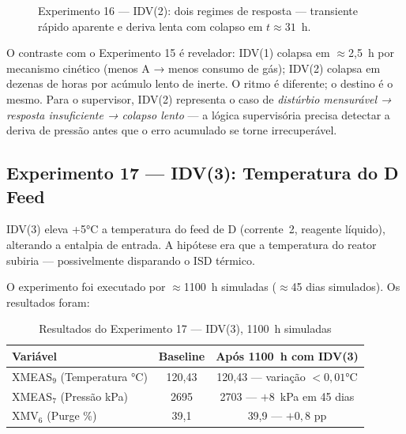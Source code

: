 \begin{figure}[htbp]
\centering
{}
\caption{Experimento 16 --- IDV(2): dois regimes de resposta --- transiente rápido aparente e deriva lenta com colapso em $t \approx 31$~h.}
\label{fig:exp16_pressure}
\end{figure}

O contraste com o Experimento 15 é revelador: IDV(1) colapsa em $\approx$2,5~h por mecanismo cinético (menos A → menos consumo de gás); IDV(2) colapsa em dezenas de horas por acúmulo lento de inerte. O ritmo é diferente; o destino é o mesmo. Para o supervisor, IDV(2) representa o caso de \textit{distúrbio mensurável → resposta insuficiente → colapso lento} — a lógica supervisória precisa detectar a deriva de pressão antes que o erro acumulado se torne irrecuperável.

\subsection{Experimento 17 — IDV(3): Temperatura do D Feed}
\label{sec:exp17}

IDV(3) eleva +5°C a temperatura do feed de D (corrente~2, reagente líquido), alterando a entalpia de entrada. A hipótese era que a temperatura do reator subiria — possivelmente disparando o ISD térmico.

O experimento foi executado por $\approx$1100~h simuladas ($\approx$45 dias simulados). Os resultados foram:

\begin{table}[ht!]
\centering
\caption{Resultados do Experimento 17 — IDV(3), 1100~h simuladas}
\label{tab:exp17}
\begin{tabular}{|l|c|c|}
\hline
\textbf{Variável}              & \textbf{Baseline}  & \textbf{Após 1100~h com IDV(3)} \\
\hline
XMEAS$_9$ (Temperatura °C)     & 120,43             & 120,43 — variação $< 0{,}01$°C \\
XMEAS$_7$ (Pressão kPa)        & 2695               & 2703 — $+8$~kPa em 45 dias     \\
XMV$_6$ (Purge \%)             & 39,1               & 39,9 — $+0{,}8$ pp              \\
\hline
\end{tabular}
\end{table}

